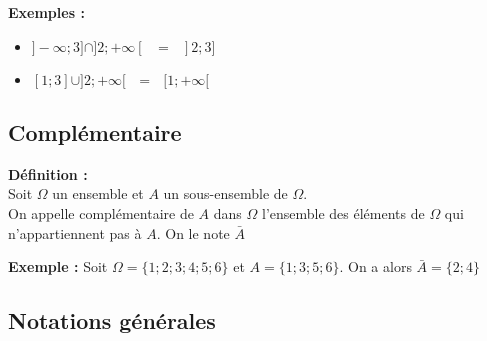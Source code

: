 \documentclass{article}
\begin{document}
\textbf{Exemples :}
\vspace{-4pt}
\begin{itemize}
	\item $ ]-\infty;3]\cap]2;+\infty[ \text{ $=$ } ]2;3]$
	\item $ [1;3] \cup ]2;+\infty[ \text{ $=$ } [1;+\infty[ $
\end{itemize}

\subsection{Complémentaire}

\begin{mdframed}[style=definitionStyle]
	\textbf{Définition :} ~\\
	Soit $\Omega$ un ensemble et $A$ un sous-ensemble de $\Omega$.\\
	On appelle complémentaire de $A$ dans $\Omega$ l'ensemble des éléments de $\Omega$ qui n'appartiennent pas à $A$. On le note $\bar{A}$
\end{mdframed}

\textbf{Exemple :} Soit $\Omega=\{ 1; 2; 3; 4; 5; 6 \}$ et $A=\{1; 3; 5; 6\}$. On a alors $\bar{A}=\{2; 4\}$

\subsection{Notations générales}
\end{document}
